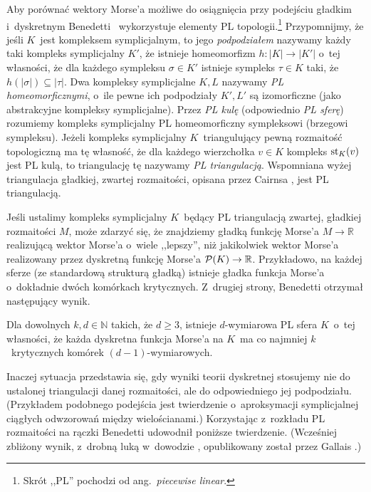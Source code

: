 Aby porównać wektory Morse'a możliwe do osiągnięcia przy podejściu gładkim i~dyskretnym Benedetti \cite{Benedetti13}~wykorzystuje elementy PL topologii.\footnote{Skrót ,,PL'' pochodzi od ang.~\textit{piecewise linear}.} Przypomnijmy, że jeśli $K$~jest kompleksem symplicjalnym, to jego \textit{podpodziałem} nazywamy każdy taki kompleks symplicjalny $K'$, że istnieje homeomorfizm \mbox{$h\colon |K|\to |K'|$} o~tej własności, że dla każdego sympleksu $\sigma\in K'$ istnieje sympleks $\tau\in K$ taki, że $h(|\sigma|)\subseteq |\tau|$. Dwa kompleksy symplicjalne $K,L$ nazywamy \textit{PL homeomorficznymi}, o~ile pewne ich podpodziały $K', L'$ są izomorficzne (jako abstrakcyjne kompleksy symplicjalne). Przez \textit{PL kulę} (odpowiednio \textit{PL sferę}) rozumiemy kompleks symplicjalny PL homeomorficzny sympleksowi (brzegowi sympleksu). Jeżeli kompleks symplicjalny $K$~triangulujący pewną rozmaitość topologiczną ma tę własność, że dla każdego wierzchołka $v\in K$ kompleks $\operatorname{st}_K(v)$ jest PL kulą, to triangulację tę nazywamy \textit{PL triangulacją}. Wspomniana wyżej triangulacja gładkiej, zwartej rozmaitości, opisana przez Cairnsa \cite{Cairns61}, jest PL triangulacją.

Jeśli ustalimy kompleks symplicjalny $K$~będący PL triangulacją zwartej, gładkiej rozmaitości $M$, może zdarzyć się, że znajdziemy gładką funkcję Morse'a $M\to \mathbb{R}$ realizującą wektor Morse'a o~wiele ,,lepszy'', niż jakikolwiek wektor Morse'a realizowany przez dyskretną funkcję Morse'a $\mathcal{P}(K)\to \mathbb{R}$. Przykładowo, na każdej sferze (ze standardową strukturą gładką) istnieje gładka funkcja Morse'a o~dokładnie dwóch komórkach krytycznych. Z~drugiej strony, Benedetti \cite{Benedetti12} otrzymał następujący wynik.

\begin{tw}
Dla dowolnych $k,d\in \mathbb{N}$ takich, że $d\geq 3$, istnieje $d$-wymiarowa PL sfera $K$~o~tej własności, że każda dyskretna funkcja Morse'a na $K$~ma co najmniej $k$~krytycznych komórek $(d-1)$-wymiarowych.
\end{tw}

Inaczej sytuacja przedstawia się, gdy wyniki teorii dyskretnej stosujemy nie do ustalonej triangulacji danej rozmaitości, ale do odpowiedniego jej podpodziału. (Przykładem podobnego podejścia jest twierdzenie o~aproksymacji symplicjalnej ciągłych odwzorowań między wielościanami.) Korzystając z~rozkładu PL rozmaitości na rączki Benedetti \cite{Benedetti13} udowodnił poniższe twierdzenie. (Wcześniej zbliżony wynik, z~drobną luką w~dowodzie \cite[Remark 2.29]{Benedetti13}, opublikowany został przez Gallais \cite[Theorem 3.1]{Gallais10}.)

